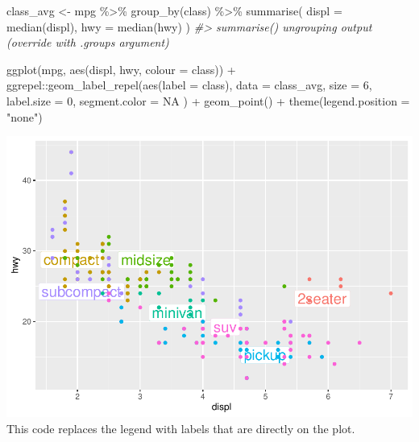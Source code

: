\documentclass[
]{article}
\newenvironment{Shaded}{\begin{snugshade}}{\end{snugshade}}
\newcommand{\AttributeTok}[1]{\textcolor[rgb]{0.77,0.63,0.00}{#1}}
\newcommand{\CommentTok}[1]{\textcolor[rgb]{0.56,0.35,0.01}{\textit{#1}}}
\newcommand{\ConstantTok}[1]{\textcolor[rgb]{0.00,0.00,0.00}{#1}}
\newcommand{\DecValTok}[1]{\textcolor[rgb]{0.00,0.00,0.81}{#1}}
\newcommand{\FunctionTok}[1]{\textcolor[rgb]{0.00,0.00,0.00}{#1}}
\newcommand{\NormalTok}[1]{#1}
\newcommand{\OtherTok}[1]{\textcolor[rgb]{0.56,0.35,0.01}{#1}}
\newcommand{\SpecialCharTok}[1]{\textcolor[rgb]{0.00,0.00,0.00}{#1}}
\newcommand{\StringTok}[1]{\textcolor[rgb]{0.31,0.60,0.02}{#1}}
\begin{document}
\begin{Shaded}
\begin{Highlighting}[]
\NormalTok{class\_avg }\OtherTok{\textless{}{-}}\NormalTok{ mpg }\SpecialCharTok{\%\textgreater{}\%}
  \FunctionTok{group\_by}\NormalTok{(class) }\SpecialCharTok{\%\textgreater{}\%}
  \FunctionTok{summarise}\NormalTok{(}
    \AttributeTok{displ =} \FunctionTok{median}\NormalTok{(displ),}
    \AttributeTok{hwy =} \FunctionTok{median}\NormalTok{(hwy)}
\NormalTok{  )}
\CommentTok{\#\textgreater{} \textasciigrave{}summarise()\textasciigrave{} ungrouping output (override with \textasciigrave{}.groups\textasciigrave{} argument)}

\FunctionTok{ggplot}\NormalTok{(mpg, }\FunctionTok{aes}\NormalTok{(displ, hwy, }\AttributeTok{colour =}\NormalTok{ class)) }\SpecialCharTok{+}
\NormalTok{  ggrepel}\SpecialCharTok{::}\FunctionTok{geom\_label\_repel}\NormalTok{(}\FunctionTok{aes}\NormalTok{(}\AttributeTok{label =}\NormalTok{ class),}
    \AttributeTok{data =}\NormalTok{ class\_avg,}
    \AttributeTok{size =} \DecValTok{6}\NormalTok{,}
    \AttributeTok{label.size =} \DecValTok{0}\NormalTok{,}
    \AttributeTok{segment.color =} \ConstantTok{NA}
\NormalTok{  ) }\SpecialCharTok{+}
  \FunctionTok{geom\_point}\NormalTok{() }\SpecialCharTok{+}
  \FunctionTok{theme}\NormalTok{(}\AttributeTok{legend.position =} \StringTok{"none"}\NormalTok{)}
\end{Highlighting}
\end{Shaded}

\includegraphics{Assignments_files/figure-latex/unnamed-chunk-60-1.pdf}
This code replaces the legend with labels that are directly on the plot.
\end{document}
